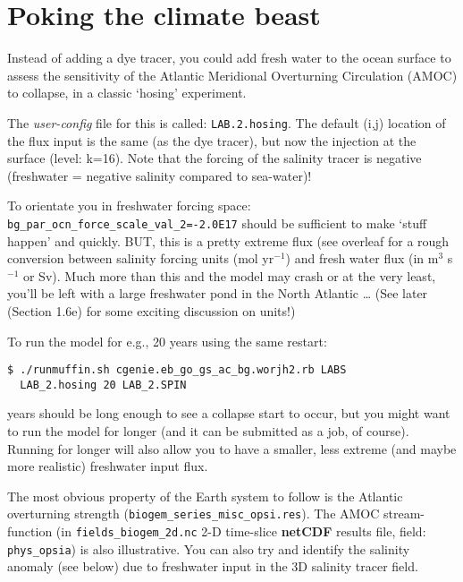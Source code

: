 \documentclass[11pt,fleqn]{book} %
\begin{document}

\newpage


\section{Poking the climate beast}

Instead of adding a dye tracer, you could add fresh water to the ocean surface to assess the sensitivity of the Atlantic Meridional Overturning Circulation (AMOC) to collapse, in a classic ‘hosing’ experiment.

The \textit{user-config} file for this is called: \texttt{LAB.2.hosing}. The default (i,j) location of the flux input is the same (as the dye tracer), but now the injection at the surface (level: k=16). Note that the forcing of the salinity tracer is negative (freshwater = negative salinity compared to sea-water)!

To orientate you in freshwater forcing space: \texttt{bg\_par\_ocn\_force\_scale\_val\_2=-2.0E17} should be sufficient to make ‘stuff happen’ and quickly. BUT, this is a pretty extreme flux (see overleaf for a rough conversion between salinity forcing units (mol yr$^{-1}$) and fresh water flux (in m$^{3}$ s$^{-1}$ or Sv). Much more than this and the model may crash or at the very least, you’ll be left with a large freshwater pond in the North Atlantic … (See later (Section 1.6e) for some exciting discussion on units!)

To run the model for e.g., 20 years using the same restart:

\vspace{-2mm}
\begin{verbatim}
$ ./runmuffin.sh cgenie.eb_go_gs_ac_bg.worjh2.rb LABS
  LAB_2.hosing 20 LAB_2.SPIN
\end{verbatim}
\vspace{-2mm}

 years should be long enough to see a collapse start to occur, but you might want to run the model for longer (and it can be submitted as a job, of course). Running for longer will also allow you to have a smaller, less extreme (and maybe more realistic) freshwater input flux.

The most obvious property of the Earth system to follow is the Atlantic overturning strength (\texttt{biogem\_series\_misc\_opsi.res}). The AMOC stream-function (in \texttt{fields\_biogem\_2d.nc} 2-D time-slice \textbf{netCDF} results file, field: \texttt{phys\_opsia}) is also illustrative. You can also try and identify the salinity anomaly (see below) due to freshwater input in the 3D salinity tracer field.
\end{document}
